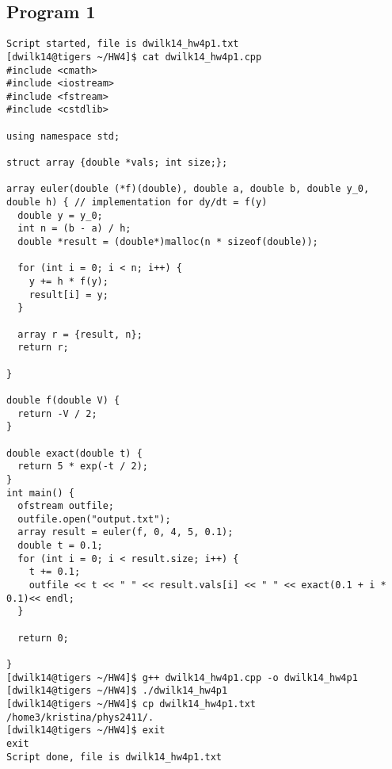\documentclass{article}
\begin{document}
\subsection*{Program 1}
\begin{verbatim}
Script started, file is dwilk14_hw4p1.txt
[dwilk14@tigers ~/HW4]$ cat dwilk14_hw4p1.cpp
#include <cmath>
#include <iostream>
#include <fstream>
#include <cstdlib>

using namespace std;

struct array {double *vals; int size;};

array euler(double (*f)(double), double a, double b, double y_0, double h) { // implementation for dy/dt = f(y)
  double y = y_0;
  int n = (b - a) / h;
  double *result = (double*)malloc(n * sizeof(double));

  for (int i = 0; i < n; i++) {
    y += h * f(y);
    result[i] = y;
  }

  array r = {result, n};
  return r;

}

double f(double V) {
  return -V / 2;
}

double exact(double t) {
  return 5 * exp(-t / 2);
}
int main() {
  ofstream outfile;
  outfile.open("output.txt");
  array result = euler(f, 0, 4, 5, 0.1);
  double t = 0.1;
  for (int i = 0; i < result.size; i++) {
    t += 0.1;
    outfile << t << " " << result.vals[i] << " " << exact(0.1 + i * 0.1)<< endl;
  }

  return 0;

}
[dwilk14@tigers ~/HW4]$ g++ dwilk14_hw4p1.cpp -o dwilk14_hw4p1
[dwilk14@tigers ~/HW4]$ ./dwilk14_hw4p1
[dwilk14@tigers ~/HW4]$ cp dwilk14_hw4p1.txt /home3/kristina/phys2411/.
[dwilk14@tigers ~/HW4]$ exit
exit
Script done, file is dwilk14_hw4p1.txt
\end{verbatim}
\end{document}
